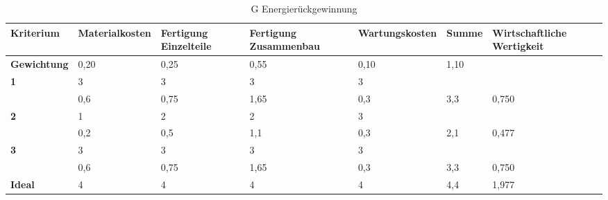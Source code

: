 \documentclass[10pt,a4paper]{article}
\begin{document}
\begin{table}[h!]
    \centering
    \hspace*{0in} %
    \begin{tabular}{>{\bfseries}p{2cm} p{2.2cm} p{2cm} p{2cm} p{2.5cm} p{2cm} p{2cm}}
        \toprule
        Kriterium  & Materialkosten & Fertigung Einzelteile & Fertigung Zusammenbau & Wartungskosten & Summe & Wirtschaftliche Wertigkeit \\
        \midrule
        Gewichtung & 0,20           & 0,25                  & 0,55                  & 0,10           & 1,10  &                            \\
        \midrule
        1          & 3              & 3                     & 3                     & 3              &       &                            \\
                   & 0,6            & 0,75                  & 1,65                  & 0,3            & 3,3   & 0,750                      \\
        \midrule
        2          & 1              & 2                     & 2                     & 3              &       &                            \\
                   & 0,2            & 0,5                   & 1,1                   & 0,3            & 2,1   & 0,477                      \\
        \midrule
        3          & 3              & 3                     & 3                     & 3              &       &                            \\
                   & 0,6            & 0,75                  & 1,65                  & 0,3            & 3,3   & 0,750                      \\
        \midrule
        Ideal      & 4              & 4                     & 4                     & 4              & 4,4   & 1,977                      \\
        \bottomrule
    \end{tabular}
    \caption{G Energierückgewinnung}
\end{table}
\end{document}
